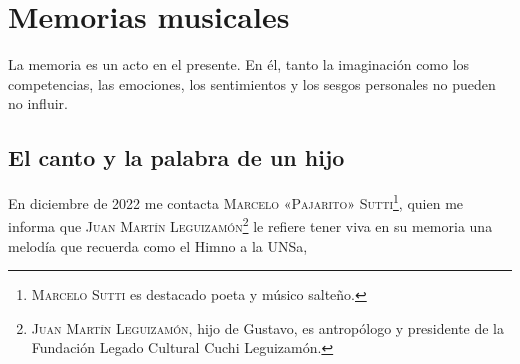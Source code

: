 \chapter{Memorias musicales}
\label{cap:memorias}

La memoria es un acto en el presente. En él, tanto la imaginación como los competencias, las emociones, los sentimientos y los sesgos personales no pueden no influir.

\section{El canto y la palabra de un hijo}
\label{sec:palabra-canto}

En diciembre de 2022 me contacta \textsc{Marcelo «Pajarito» Sutti}\footnote{\textsc{Marcelo Sutti} es destacado poeta y músico salteño.}, quien me informa que \textsc{Juan Martín Leguizamón}\footnote{\textsc{Juan Martín Leguizamón}, hijo de Gustavo, es antropólogo y presidente de la Fundación Legado Cultural Cuchi Leguizamón.} le refiere tener viva en su memoria una melodía que recuerda como el Himno a la UNSa,
